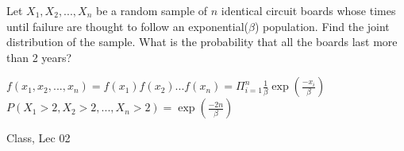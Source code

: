 \begin{ex}
Let $X_1, X_2, ..., X_n$ be a random sample of $n$ identical circuit boards whose times until failure are thought to follow an exponential($\beta$) population. Find the joint distribution of the sample. What is the probability that all the boards last more than 2 years?
\end{ex}
\begin{sol}
$f(x_1, x_2, ..., x_n)  = f(x_1) f(x_2) ... f(x_n) = \Pi_{i=1}^n \frac{1}{\beta} \exp(\frac{-x_i}{\beta})$ \\
$P(X_1 > 2, X_2 > 2, ..., X_n > 2) = \exp(\frac{-2n}{\beta})$
\end{sol}
\begin{source}
    Class, Lec 02
\end{source}
